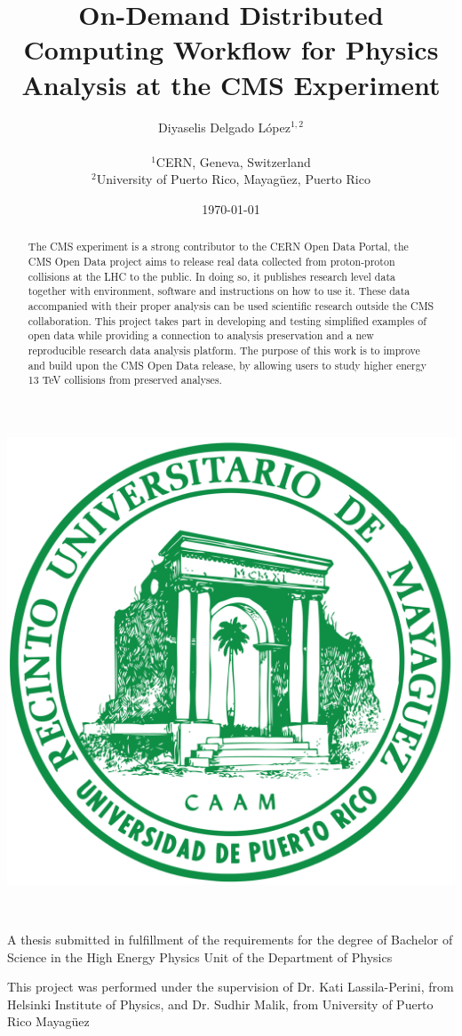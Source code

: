 \documentclass[letter]{article}
\title{\textbf{On-Demand Distributed Computing Workflow for Physics Analysis at the CMS Experiment}}
\author{Diyaselis Delgado López$^{1,2}$ \\ \\ \small $^1$CERN, Geneva, Switzerland \\ \small $^2$University of Puerto Rico, Mayagüez, Puerto Rico}
\date{\today}
\begin{document}
\maketitle
\vspace{15pt}
\begin{center}
    \includegraphics[scale=0.1]{rum}
\end{center}
\vspace{30pt} \\

\newline

A thesis submitted in fulfillment of the requirements for the degree of Bachelor of Science in the High Energy Physics Unit of the Department of Physics
\\
\vspace{15pt}

\newline 
This project was performed under the supervision of Dr. Kati Lassila-Perini, from Helsinki Institute of Physics, and Dr. Sudhir Malik, from University of Puerto Rico Mayagüez
\thispagestyle{empty}

\newpage
\begin{abstract}
The CMS experiment is a strong contributor to the CERN Open Data Portal, the CMS Open Data project aims to release real data collected from proton-proton collisions at the LHC to the public. In doing so, it publishes research level data together with environment, software and instructions on how to use it. These data accompanied with their proper analysis can be used scientific research outside the CMS collaboration.
This project takes part in developing and testing simplified examples of open data while providing a connection to analysis preservation and a new reproducible research data analysis platform. The purpose of this work is to improve and build upon the CMS Open Data release, by allowing users to study higher energy 13 TeV collisions from preserved analyses. 
\end{abstract}
\end{document}
